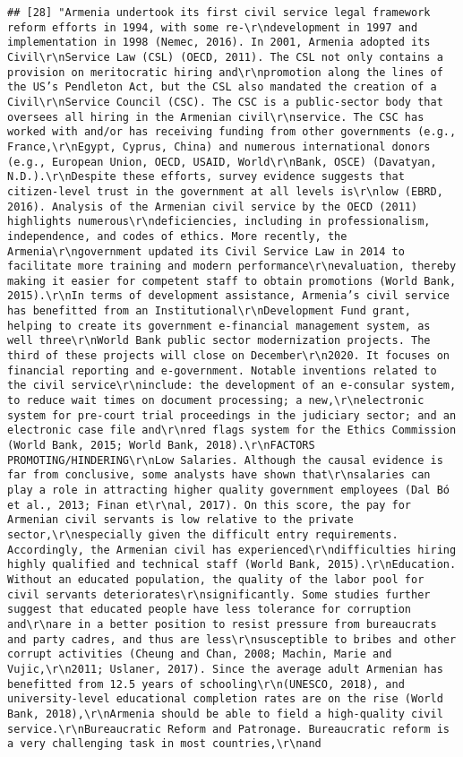 \documentclass[
]{article}
\begin{document}
\begin{verbatim}
## [28] "Armenia undertook its first civil service legal framework reform efforts in 1994, with some re-\r\ndevelopment in 1997 and implementation in 1998 (Nemec, 2016). In 2001, Armenia adopted its Civil\r\nService Law (CSL) (OECD, 2011). The CSL not only contains a provision on meritocratic hiring and\r\npromotion along the lines of the US’s Pendleton Act, but the CSL also mandated the creation of a Civil\r\nService Council (CSC). The CSC is a public-sector body that oversees all hiring in the Armenian civil\r\nservice. The CSC has worked with and/or has receiving funding from other governments (e.g., France,\r\nEgypt, Cyprus, China) and numerous international donors (e.g., European Union, OECD, USAID, World\r\nBank, OSCE) (Davatyan, N.D.).\r\nDespite these efforts, survey evidence suggests that citizen-level trust in the government at all levels is\r\nlow (EBRD, 2016). Analysis of the Armenian civil service by the OECD (2011) highlights numerous\r\ndeficiencies, including in professionalism, independence, and codes of ethics. More recently, the Armenia\r\ngovernment updated its Civil Service Law in 2014 to facilitate more training and modern performance\r\nevaluation, thereby making it easier for competent staff to obtain promotions (World Bank, 2015).\r\nIn terms of development assistance, Armenia’s civil service has benefitted from an Institutional\r\nDevelopment Fund grant, helping to create its government e-financial management system, as well three\r\nWorld Bank public sector modernization projects. The third of these projects will close on December\r\n2020. It focuses on financial reporting and e-government. Notable inventions related to the civil service\r\ninclude: the development of an e-consular system, to reduce wait times on document processing; a new,\r\nelectronic system for pre-court trial proceedings in the judiciary sector; and an electronic case file and\r\nred flags system for the Ethics Commission (World Bank, 2015; World Bank, 2018).\r\nFACTORS PROMOTING/HINDERING\r\nLow Salaries. Although the causal evidence is far from conclusive, some analysts have shown that\r\nsalaries can play a role in attracting higher quality government employees (Dal Bó et al., 2013; Finan et\r\nal, 2017). On this score, the pay for Armenian civil servants is low relative to the private sector,\r\nespecially given the difficult entry requirements. Accordingly, the Armenian civil has experienced\r\ndifficulties hiring highly qualified and technical staff (World Bank, 2015).\r\nEducation. Without an educated population, the quality of the labor pool for civil servants deteriorates\r\nsignificantly. Some studies further suggest that educated people have less tolerance for corruption and\r\nare in a better position to resist pressure from bureaucrats and party cadres, and thus are less\r\nsusceptible to bribes and other corrupt activities (Cheung and Chan, 2008; Machin, Marie and Vujic,\r\n2011; Uslaner, 2017). Since the average adult Armenian has benefitted from 12.5 years of schooling\r\n(UNESCO, 2018), and university-level educational completion rates are on the rise (World Bank, 2018),\r\nArmenia should be able to field a high-quality civil service.\r\nBureaucratic Reform and Patronage. Bureaucratic reform is a very challenging task in most countries,\r\nand 
\end{verbatim}
\end{document}
